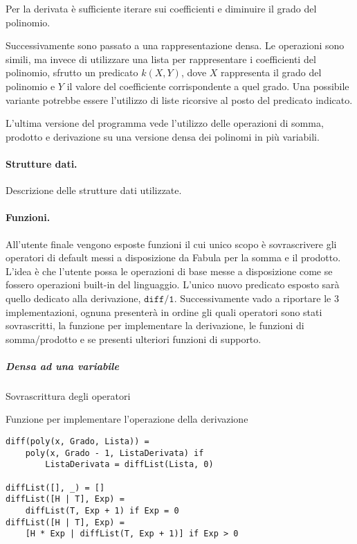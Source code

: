 \documentclass[12pt,twoside]{report}
\begin{document}
Per la derivata è sufficiente iterare sui coefficienti e diminuire il grado del polinomio.

Successivamente sono passato a una rappresentazione densa. Le operazioni sono simili, ma invece di utilizzare una lista per rappresentare i coefficienti del polinomio, sfrutto un predicato \(k(X, Y)\), dove \(X\) rappresenta il grado del polinomio e \(Y\) il valore del coefficiente corrispondente a quel grado. Una possibile variante potrebbe essere l'utilizzo di liste ricorsive al posto del predicato indicato.

L'ultima versione del programma vede l'utilizzo delle operazioni di somma, prodotto e derivazione su una versione densa dei polinomi in più variabili.


\paragraph{Strutture dati.} Descrizione delle strutture dati utilizzate. 

\paragraph{Funzioni.} All'utente finale vengono esposte funzioni il cui unico scopo è sovrascrivere gli operatori di default messi a disposizione da Fabula per la somma e il prodotto. L'idea è che l'utente possa le operazioni di base messe a disposizione come se fossero operazioni built-in del linguaggio. L'unico nuovo predicato esposto sarà quello dedicato alla derivazione, \( \texttt{diff/1} \).
Successivamente vado a riportare le 3 implementazioni, ognuna presenterà in ordine gli quali operatori sono stati sovrascritti, la funzione per implementare la derivazione, le funzioni di somma/prodotto e se presenti ulteriori funzioni di supporto.

\subparagraph{Densa ad una variabile}

Sovrascrittura degli operatori

Funzione per implementare l'operazione della derivazione

\begin{lstlisting}
diff(poly(x, Grado, Lista)) = 
    poly(x, Grado - 1, ListaDerivata) if
        ListaDerivata = diffList(Lista, 0)

diffList([], _) = []
diffList([H | T], Exp) = 
    diffList(T, Exp + 1) if Exp = 0
diffList([H | T], Exp) = 
    [H * Exp | diffList(T, Exp + 1)] if Exp > 0
\end{lstlisting}
\end{document}
